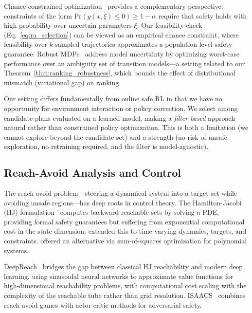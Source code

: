 \documentclass{article}
\renewcommand{\Pr}{\mathrm{Pr}}
\begin{document}
Chance-constrained optimization~\citep{nemirovski2006convex, calafiore2006scenario} provides a complementary perspective: constraints of the form $\Pr(g(x,\xi) \leq 0) \geq 1-\alpha$ require that safety holds with high probability over uncertain parameters $\xi$. Our feasibility check (Eq.~\ref{eq:ra_selection}) can be viewed as an empirical chance constraint, where feasibility over $k$ sampled trajectories approximates a population-level safety guarantee. Robust MDPs~\citep{iyengar2005robust, nilim2005robust} address model uncertainty by optimizing worst-case performance over an ambiguity set of transition models---a setting related to our Theorem~\ref{thm:ranking_robustness}, which bounds the effect of distributional mismatch (variational gap) on ranking.

Our setting differs fundamentally from online safe RL in that we have no opportunity for environment interaction or policy correction. We select among candidate plans evaluated on a learned model, making a \emph{filter-based} approach natural rather than constrained policy optimization. This is both a limitation (we cannot explore beyond the candidate set) and a strength (no risk of unsafe exploration, no retraining required, and the filter is model-agnostic).

\subsection{Reach-Avoid Analysis and Control}

The reach-avoid problem---steering a dynamical system into a target set while avoiding unsafe regions---has deep roots in control theory. The Hamilton-Jacobi (HJ) formulation~\citep{mitchell2005reach} computes backward reachable sets by solving a PDE, providing formal safety guarantees but suffering from exponential computational cost in the state dimension. \citet{fisac2015reach} extended this to time-varying dynamics, targets, and constraints. \citet{altschuler2023reach} offered an alternative via sum-of-squares optimization for polynomial systems.

DeepReach~\citep{bansal2021deepreach} bridges the gap between classical HJ reachability and modern deep learning, using sinusoidal neural networks to approximate value functions for high-dimensional reachability problems, with computational cost scaling with the complexity of the reachable tube rather than grid resolution. ISAACS~\citep{hsu2023isaacs} combines reach-avoid games with actor-critic methods for adversarial safety.
\end{document}
